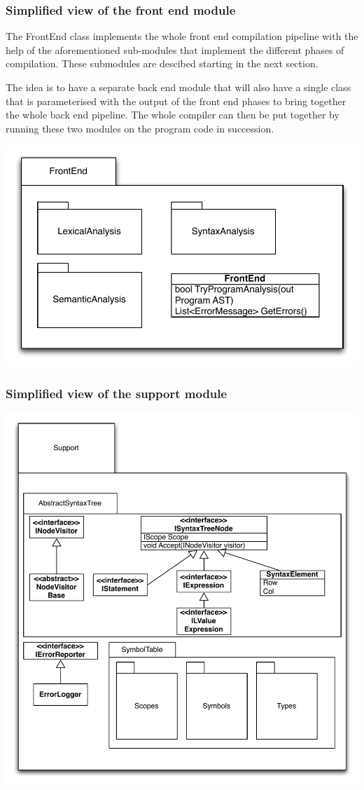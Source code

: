 \documentclass[a4paper,11pt]{article}
\begin{document}
\subsubsection{Simplified view of the front end module}

The FrontEnd class implements the whole front end compilation pipeline with the help of the aforementioned sub-modules that implement the different phases of compilation. These submodules are descibed starting in the next section.

The idea is to have a separate back end module that will also have a single class that is parameterised with the output of the front end phases to bring together the whole back end pipeline. The whole compiler can then be put together by running these two modules on the program code in succession.

\includegraphics[width=1.0\textwidth]{frontend.pdf}

\subsubsection{Simplified view of the support module}

\includegraphics[width=1.0\textwidth]{support.pdf}
\end{document}
